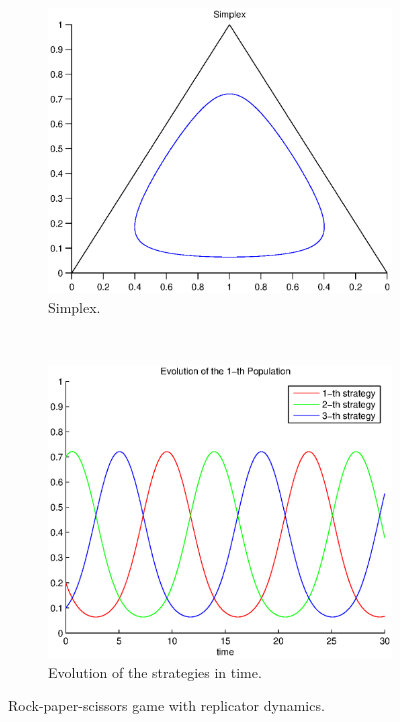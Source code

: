 \documentclass[a4paper,10pt]{article}
\begin{document}
\begin{figure}
  \centering
  \begin{subfigure}[b]{0.45\textwidth}
	  \includegraphics[width=\textwidth]{./images/test1_simplex_rd.eps}
	  \caption{Simplex.}
	  \label{fig:test1_simplex_rd}
  \end{subfigure}
  ~ 
  \begin{subfigure}[b]{0.45\textwidth}
	  \includegraphics[width=\textwidth]{./images/test1_ev_rd.eps}
	  \caption{Evolution of the strategies in time.}
	  \label{fig:test1_ev_rd}
  \end{subfigure}
  \caption{Rock-paper-scissors game with replicator dynamics.}
  \label{fig:rpc_game_rd}
\end{figure}
\end{document}
